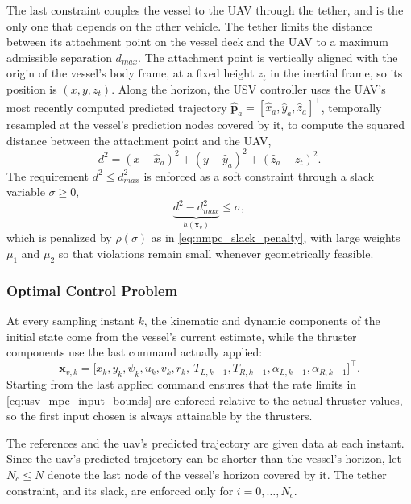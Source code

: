 The last constraint couples the vessel to the UAV through the tether, and is the only one that depends on the other vehicle. The tether limits the distance between its attachment point on the vessel deck and the UAV to a maximum admissible separation $d_{max}$. The attachment point is vertically aligned with the origin of the vessel's body frame, at a fixed height $z_t$ in the inertial frame, so its position is $(x, y, z_t)$. Along the horizon, the USV controller uses the UAV's most recently computed predicted trajectory $\hat{\mathbf{p}}_a = [\hat x_a, \hat y_a, \hat z_a]^\top$, temporally resampled at the vessel's prediction nodes covered by it, to compute the squared distance between the attachment point and the UAV,
\begin{equation}
    d^2 = (x - \hat x_a)^2 + (y - \hat y_a)^2 + (\hat z_a - z_t)^2.
    \label{eq:usv_mpc_tether_distance}
\end{equation}
The requirement $d^2 \le d_{max}^2$ is enforced as a soft constraint through a slack variable $\sigma \ge 0$,
\begin{equation}
    \underbrace{d^2 - d_{max}^2}_{h(\mathbf{x}_v)} \le \sigma,
    \label{eq:usv_mpc_tether_constraint}
\end{equation}
which is penalized by $\rho(\sigma)$ as in \eqref{eq:nmpc_slack_penalty}, with large weights $\mu_1$ and $\mu_2$ so that violations remain small whenever geometrically feasible.

\subsubsection*{Optimal Control Problem}
 
At every sampling instant $k$, the kinematic and dynamic components of the initial state come from the vessel's current estimate, while the thruster components use the last command actually applied:
\begin{equation}
    \mathbf{x}_{v,k} = \big[x_k, y_k, \psi_k, u_k, v_k, r_k,\ T_{L,k-1}, T_{R,k-1}, \alpha_{L,k-1}, \alpha_{R,k-1}\big]^\top.
    \label{eq:usv_mpc_initial_condition}
\end{equation}
Starting from the last applied command ensures that the rate limits in \eqref{eq:usv_mpc_input_bounds} are enforced relative to the actual thruster values, so the first input chosen is always attainable by the thrusters.

The references and the \gls{uav}'s predicted trajectory are given data at each instant. Since the \gls{uav}'s predicted trajectory can be shorter than the vessel's horizon, let $N_c \le N$ denote the last node of the vessel's horizon covered by it. The tether constraint, and its slack, are enforced only for $i = 0, \dots, N_c$.
 
